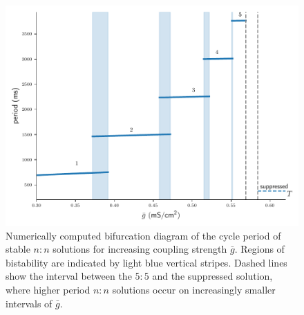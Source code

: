 \documentclass[utf8]{frontiersFPHY} %
\begin{document}
\begin{figure}[h!]
	\centering
	\includegraphics{bif-diagram}
	\caption{Numerically computed bifurcation diagram of the cycle period of stable $n:n$ solutions for increasing coupling strength $\bar g$. Regions of bistability are indicated by light blue vertical stripes. Dashed lines show the interval between the $5:5$ and the suppressed solution, where higher period $n:n$ solutions occur on increasingly smaller intervals of $\bar g$.\label{fig:bif-diagram}}
\end{figure}
\end{document}
